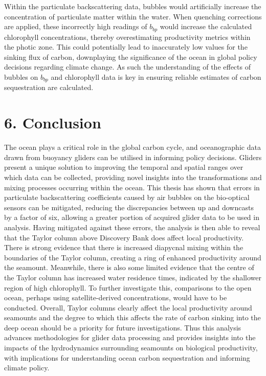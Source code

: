 \documentclass[
	a4paper, %
	10pt, %
	unnumberedsections, %
	twoside, %
]{LTJournalArticle}
\begin{document}
\begin{multicols}{2}
Within the particulate backscattering data, bubbles would artificially increase the concentration of particulate matter within the water.
When quenching corrections are applied, these incorrectly high readings of $b_{bp}$ would increase the calculated chlorophyll concentrations,
thereby overestimating productivity metrics within the photic zone. This could potentially lead to inaccurately low values for the sinking flux
of carbon, downplaying the significance of the ocean in global policy decisions regarding climate change. As such the understanding of the
effects of bubbles on $b_{bp}$ and chlorophyll data is key in ensuring reliable estimates of carbon sequestration are calculated.

\section{6. Conclusion}

The ocean plays a critical role in the global carbon cycle, and oceanographic data drawn from buoyancy gliders can be utilised in informing
policy decisions. Gliders present a unique solution to improving the temporal and spatial ranges over which data can be collected, providing
novel insights into the transformations and mixing processes occurring within the ocean. This thesis has shown that errors in particulate
backscattering coefficients caused by air bubbles on the bio-optical sensors can be mitigated, reducing the discrepancies between up and downcasts 
by a factor of six, allowing a greater portion of acquired glider data to be used in analysis. Having mitigated against these errors, the analysis
is then able to reveal that the Taylor column above Discovery Bank does affect local productivity. There is strong evidence that there is increased
diapycnal mixing within the boundaries of the Taylor column, creating a ring of enhanced productivity around the seamount. Meanwhile, there is also
some limited evidence that the centre of the Taylor column has increased water residence times, indicated by the shallower region of high 
chlorophyll. To further investigate this, comparisons to the open ocean, perhaps using satellite-derived concentrations, would have to be conducted.
Overall, Taylor columns clearly affect the local productivity around seamounts and the degree to which this affects the rate of carbon sinking
into the deep ocean should be a priority for future investigations. Thus this analysis advances methodologies for glider data processing and
provides insights into the impacts of the hydrodynamics surrounding seamounts on biological productivity, with implications for understanding
ocean carbon sequestration and informing climate policy.


\end{multicols}
\vfill{}
\end{document}
